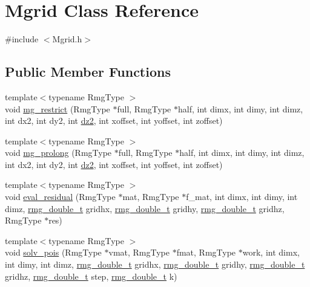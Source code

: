 \hypertarget{class_mgrid}{\section{Mgrid Class Reference}
\label{class_mgrid}
}


{\ttfamily \#include $<$Mgrid.\-h$>$}

\subsection*{Public Member Functions}
\begin{DoxyCompactItemize}
\item 
{\footnotesize template$<$typename Rmg\-Type $>$ }\\void \hyperlink{class_mgrid_a3725a975f60f1550b8fae16e13150b91}{mg\-\_\-restrict} (Rmg\-Type $\ast$full, Rmg\-Type $\ast$half, int dimx, int dimy, int dimz, int dx2, int dy2, int \hyperlink{_t_d_d_f_t_2_common_2init__wf__gaussian_8c_a7c91c0a086e887eb41c7bc49b66e0ee2}{dz2}, int xoffset, int yoffset, int zoffset)
\item 
{\footnotesize template$<$typename Rmg\-Type $>$ }\\void \hyperlink{class_mgrid_a9a1bdf5667e4728e65ee15e3f02f754c}{mg\-\_\-prolong} (Rmg\-Type $\ast$full, Rmg\-Type $\ast$half, int dimx, int dimy, int dimz, int dx2, int dy2, int \hyperlink{_t_d_d_f_t_2_common_2init__wf__gaussian_8c_a7c91c0a086e887eb41c7bc49b66e0ee2}{dz2}, int xoffset, int yoffset, int zoffset)
\item 
{\footnotesize template$<$typename Rmg\-Type $>$ }\\void \hyperlink{class_mgrid_a6e3a0a0a405b84e0fa0190da9d046202}{eval\-\_\-residual} (Rmg\-Type $\ast$mat, Rmg\-Type $\ast$f\-\_\-mat, int dimx, int dimy, int dimz, \hyperlink{rmgtypes_8h_aaa16921c14f121c56eaa42390a340db8}{rmg\-\_\-double\-\_\-t} gridhx, \hyperlink{rmgtypes_8h_aaa16921c14f121c56eaa42390a340db8}{rmg\-\_\-double\-\_\-t} gridhy, \hyperlink{rmgtypes_8h_aaa16921c14f121c56eaa42390a340db8}{rmg\-\_\-double\-\_\-t} gridhz, Rmg\-Type $\ast$res)
\item 
{\footnotesize template$<$typename Rmg\-Type $>$ }\\void \hyperlink{class_mgrid_a27dcdbf0cc5163f7397ac9f4e4e59b7d}{solv\-\_\-pois} (Rmg\-Type $\ast$vmat, Rmg\-Type $\ast$fmat, Rmg\-Type $\ast$work, int dimx, int dimy, int dimz, \hyperlink{rmgtypes_8h_aaa16921c14f121c56eaa42390a340db8}{rmg\-\_\-double\-\_\-t} gridhx, \hyperlink{rmgtypes_8h_aaa16921c14f121c56eaa42390a340db8}{rmg\-\_\-double\-\_\-t} gridhy, \hyperlink{rmgtypes_8h_aaa16921c14f121c56eaa42390a340db8}{rmg\-\_\-double\-\_\-t} gridhz, \hyperlink{rmgtypes_8h_aaa16921c14f121c56eaa42390a340db8}{rmg\-\_\-double\-\_\-t} step, \hyperlink{rmgtypes_8h_aaa16921c14f121c56eaa42390a340db8}{rmg\-\_\-double\-\_\-t} k)

\end{DoxyCompactItemize}
